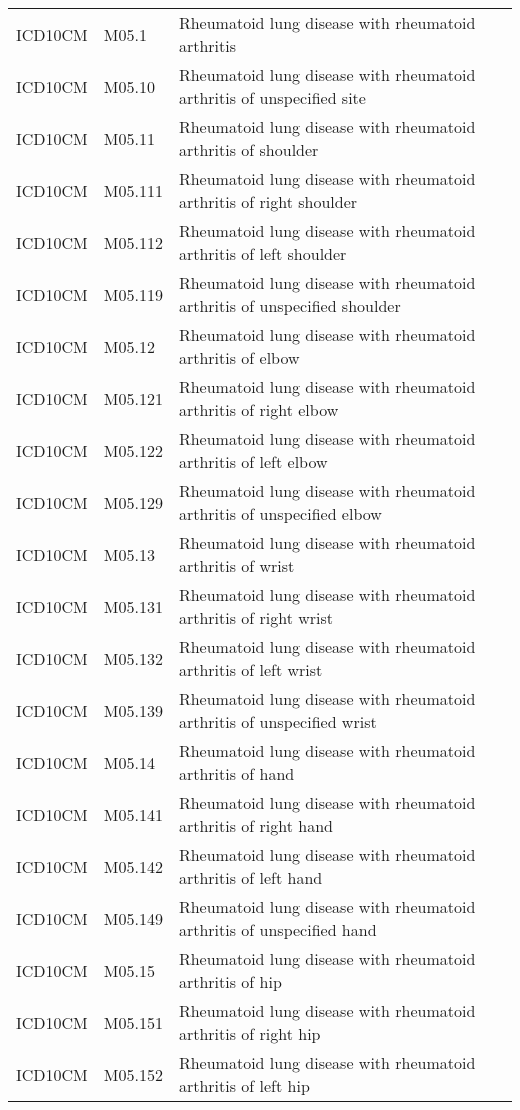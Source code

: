 \begin{longtable}{p{}p{}p{}}
  ICD10CM & M05.1 & Rheumatoid lung disease with rheumatoid arthritis \\ 
  ICD10CM & M05.10 & Rheumatoid lung disease with rheumatoid arthritis of unspecified site \\ 
  ICD10CM & M05.11 & Rheumatoid lung disease with rheumatoid arthritis of shoulder \\ 
  ICD10CM & M05.111 & Rheumatoid lung disease with rheumatoid arthritis of right shoulder \\ 
  ICD10CM & M05.112 & Rheumatoid lung disease with rheumatoid arthritis of left shoulder \\ 
  ICD10CM & M05.119 & Rheumatoid lung disease with rheumatoid arthritis of unspecified shoulder \\ 
  ICD10CM & M05.12 & Rheumatoid lung disease with rheumatoid arthritis of elbow \\ 
  ICD10CM & M05.121 & Rheumatoid lung disease with rheumatoid arthritis of right elbow \\ 
  ICD10CM & M05.122 & Rheumatoid lung disease with rheumatoid arthritis of left elbow \\ 
  ICD10CM & M05.129 & Rheumatoid lung disease with rheumatoid arthritis of unspecified elbow \\ 
  ICD10CM & M05.13 & Rheumatoid lung disease with rheumatoid arthritis of wrist \\ 
  ICD10CM & M05.131 & Rheumatoid lung disease with rheumatoid arthritis of right wrist \\ 
  ICD10CM & M05.132 & Rheumatoid lung disease with rheumatoid arthritis of left wrist \\ 
  ICD10CM & M05.139 & Rheumatoid lung disease with rheumatoid arthritis of unspecified wrist \\ 
  ICD10CM & M05.14 & Rheumatoid lung disease with rheumatoid arthritis of hand \\ 
  ICD10CM & M05.141 & Rheumatoid lung disease with rheumatoid arthritis of right hand \\ 
  ICD10CM & M05.142 & Rheumatoid lung disease with rheumatoid arthritis of left hand \\ 
  ICD10CM & M05.149 & Rheumatoid lung disease with rheumatoid arthritis of unspecified hand \\ 
  ICD10CM & M05.15 & Rheumatoid lung disease with rheumatoid arthritis of hip \\ 
  ICD10CM & M05.151 & Rheumatoid lung disease with rheumatoid arthritis of right hip \\ 
  ICD10CM & M05.152 & Rheumatoid lung disease with rheumatoid arthritis of left hip \\ 

\end{longtable}
